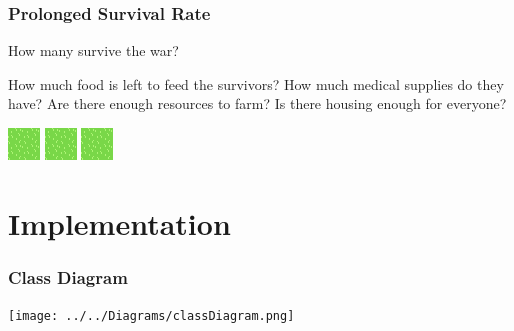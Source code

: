 \documentclass[ascpectratio=169]{beamer}
\begin{document}


\begin{frame}

  \frametitle{Prolonged Survival Rate}

  \begin{center}
    {\large How many survive the war?}
  \end{center}

  \begin{outline}
    \1 How much food is left to feed the survivors?
    \1 How much medical supplies do they have?
    \1 Are there enough resources to farm?
    \1 Is there housing enough for everyone?
  \end{outline}

  \begin{center}
    \includegraphics[scale=2.0, trim=2cm 0 0 0]{../../Images/grasstile.png}
    \includegraphics[scale=2.0]{../../Images/grasstile.png}
    \includegraphics[scale=2.0, trim=0 0 2cm 0]{../../Images/grasstile.png}
  \end{center}
  
\end{frame}


\section{Implementation}


\begin{frame}

  \frametitle{Class Diagram}

  \begin{center}
    \texttt{[image: ../../Diagrams/classDiagram.png]}
  \end{center}

\end{frame}
\end{document}
